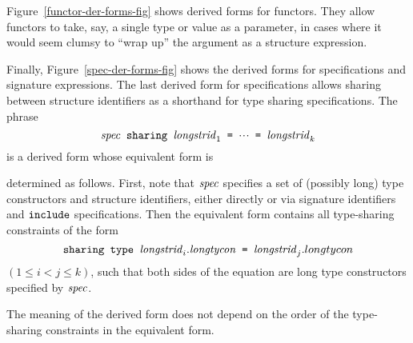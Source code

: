 Figure~\ref{functor-der-forms-fig} shows derived forms for functors.
They allow functors to take, say, a single type or value as a parameter,
in cases where it would seem clumsy to ``wrap up'' the argument as a
structure expression.


Finally, Figure~\ref{spec-der-forms-fig} shows the derived forms for specifications and signature expressions.
The last derived form for specifications allows sharing between structure
identifiers as a shorthand for type sharing specifications. 
The phrase
 \[
 \mbox{\tt ${\it spec}$ sharing ${\it longstrid}_1$ = $\mbox{$\cdot\!\cdot\!\cdot$}$ = ${\it longstrid}_k$}
 \]
is a derived form whose equivalent form is

\medskip


\noindent
determined as follows. 
First, note that  ${\it spec}$  specifies a set of 
     (possibly long) type constructors and structure identifiers, either 
     directly or via signature identifiers and ${\tt include}$ specifications.  
     Then the equivalent form contains all type-sharing constraints 
     of the form 
\[\mbox{\tt sharing type ${\it longstrid}_i.{\it longtycon}$ = ${\it longstrid}_j.longtycon$}\]
     $(1\leq i<j\leq k)$,  such that both sides of the equation are long type 
     constructors specified by  ${\it spec}$. 

     The meaning of the derived form does not depend on the order of the 
     type-sharing constraints in the equivalent form.




